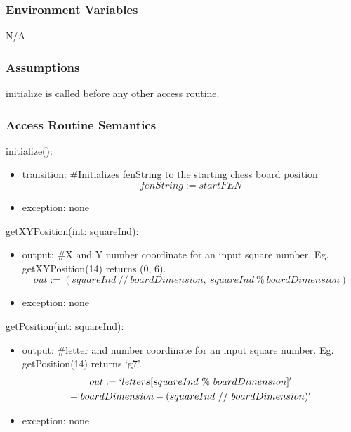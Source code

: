 \documentclass[12pt, titlepage]{article}
\begin{document}
    \subsubsection{Environment Variables}
    N/A

    \subsubsection{Assumptions}
    initialize is called before any other access routine.

    \subsubsection{Access Routine Semantics}
        \noindent initialize():
        \begin{itemize}
            \item transition: \#Initializes fenString to the starting chess board position \\
                \[fenString := startFEN\]
            \item exception: none
        \end{itemize}

        \noindent getXYPosition(int: squareInd):
        \begin{itemize}
            \item output: \#X and Y number coordinate for an input square number. 
                Eg. getXYPosition(14) returns (0, 6). \\
                \[out := (squareInd\ //\ boardDimension,\ squareInd\ \%\ boardDimension)\]
            \item exception: none
        \end{itemize}

        \noindent getPosition(int: squareInd):
        \begin{itemize}
            \item output: \#letter and number coordinate for an input square number.
                Eg. getPosition(14) returns `g7'. \\
                \begin{multline}
                    out := `letters[squareInd\ \%\ boardDimension]' \notag\\ 
                    + `boardDimension - (squareInd\ //\ boardDimension)'
                \end{multline}
                
            \item exception: none
        \end{itemize}
\end{document}
